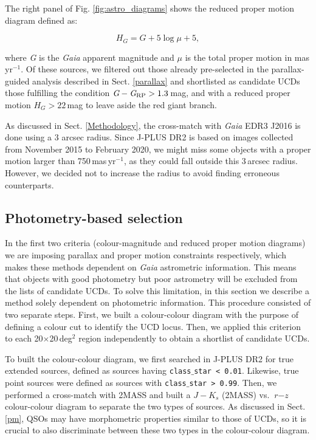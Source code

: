 The right panel of Fig. \ref{fig:astro_diagrams} shows the reduced proper motion diagram defined as:

\begin{equation}
    H_G=\textit{G} + 5\log{\mu} + 5,
	\label{eq:reducedpm}
\end{equation}

\noindent where \textit{G} is the \textit{Gaia} apparent magnitude and $\mu$ is the total proper motion in mas\,yr$^{-1}$. Of these sources, we filtered out those already pre-selected in the parallax-guided analysis described in Sect. \ref{parallax} and shortlisted as candidate UCDs those fulfilling the condition $\textit{G} - \textit{G}_{\rm RP} > 1.3$\,mag, and with a reduced proper motion $H_G > 22$\,mag to leave aside the red giant branch.

As discussed in Sect. \ref{Methodology}, the cross-match with \textit{Gaia} EDR3 J2016 is done using a 3 arcsec radius. Since J-PLUS DR2 is based on images collected from November 2015 to February 2020, we might miss some objects with a proper motion larger than 750\,mas\,yr$^{-1}$, as they could fall outside this 3\,arcsec radius. However, we decided not to increase the radius to avoid finding erroneous counterparts.

\subsection{Photometry-based selection} \label{colordiagram}


In the first two criteria (colour-magnitude and reduced proper motion diagrams) we are imposing parallax and proper motion constraints respectively, which makes these methods dependent on \textit{Gaia} astrometric information. This means that objects with good photometry but poor astrometry will be excluded from the lists of candidate UCDs. To solve this limitation, in this section we describe a method solely dependent on photometric information. This procedure consisted of two separate steps. First, we built a colour-colour diagram with the purpose of defining a colour cut to identify the UCD locus. Then, we applied this criterion to each 20$\times$20\,deg$^2$ region independently to obtain a shortlist of candidate UCDs.

To built the colour-colour diagram, we first searched in J-PLUS DR2 for true extended sources, defined as sources having \texttt{class$\_$star < 0.01}. Likewise, true point sources were defined as sources with \texttt{class$\_$star > 0.99}. Then, we performed a cross-match with 2MASS and built a $\textit{J}-\textit{K}_s$ (2MASS) vs. $\textit{r}-\textit{z}$ colour-colour diagram to separate the two types of sources.  As discussed in Sect. \ref{pm}, QSOs may have morphometric properties similar to those of UCDs, so it is crucial to also discriminate between these two types in the colour-colour diagram.


